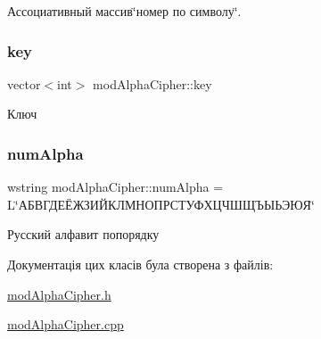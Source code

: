 Ассоциативный массив\char`\"{}номер по символу\char`\"{}. 

\mbox{\label{classmodAlphaCipher_a318efb0cdcd8bc0c084097e175c2006b}} 
\subsubsection{\texorpdfstring{key}{key}}
{\footnotesize\ttfamily vector$<$int$>$ mod\+Alpha\+Cipher\+::key\hspace{0.3cm}{\ttfamily [private]}}



Ключ 

\mbox{\label{classmodAlphaCipher_a9f83731ae4d58df14e1df3bd089d7501}} 
\subsubsection{\texorpdfstring{num\+Alpha}{numAlpha}}
{\footnotesize\ttfamily wstring mod\+Alpha\+Cipher\+::num\+Alpha = L\char`\"{}АБВГДЕЁЖЗИЙКЛМНОПРСТУФХЦЧШЩЪЫЬЭЮЯ\char`\"{}\hspace{0.3cm}{\ttfamily [private]}}



Русский алфавит попорядку 



Документація цих класів була створена з файлів\+:\begin{DoxyCompactItemize}
\item 
\hyperlink{modAlphaCipher_8h}{mod\+Alpha\+Cipher.\+h}\item 
\hyperlink{modAlphaCipher_8cpp}{mod\+Alpha\+Cipher.\+cpp}\end{DoxyCompactItemize}
